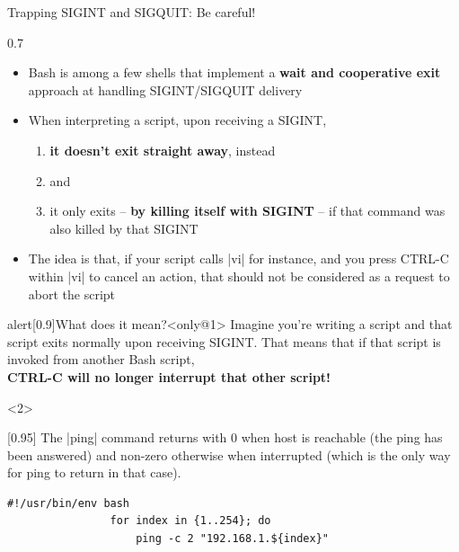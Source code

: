 \begin{frame}[fragile]{Trapping SIGINT and SIGQUIT: Be careful!}
    \begin{overlayarea}{\textwidth}{0.7\textheight}
        \begin{itemize}
            \item Bash is among a few shells that implement a \textbf{wait and cooperative exit} approach at handling SIGINT/SIGQUIT delivery
            \item When interpreting a script, upon receiving a SIGINT,
            \begin{enumerate}
                \item \textbf{it doesn't exit straight away}, instead
                \item {} and
                \item \alert{it only exits -- \textbf{by killing itself with SIGINT} -- if that command was also killed by that SIGINT}
            \end{enumerate}
            \item<only@1> The idea is that, if your script calls \bash|vi| for instance, and you press CTRL-C within \bash|vi| to cancel an action, that should not be considered as a request to abort the script
        \end{itemize}
        \begin{varblock}{alert}[0.9\textwidth]{What does it mean?}<only@1>
            Imagine you're writing a script and that script exits normally upon receiving SIGINT.
            That means that if that script is invoked from another Bash script, \\\alert{\textbf{CTRL-C will no longer interrupt that other script!}}
        \end{varblock}
        \begin{onlyenv}<2>
            \begin{varblock}{}[0.95\textwidth]{}
                \small The \bash|ping| command returns with 0 when host is reachable (the ping has been answered) and non-zero otherwise when interrupted (which is the only way for ping to return in that case).
            \end{varblock}
            \begin{lstlisting}[style=MyBash, aboveskip=0mm, belowskip=-6mm]
                #!/usr/bin/env bash
                for index in {1..254}; do
                    ping -c 2 "192.168.1.${index}"

\end{lstlisting}
\end{onlyenv}
\end{overlayarea}
\end{frame}
